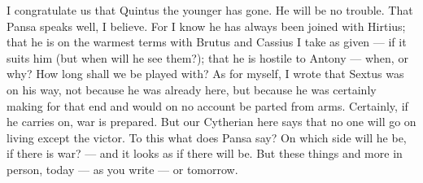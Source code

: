 

 I congratulate us that Quintus the younger has gone. He will be no trouble. That Pansa speaks well, I believe. For I know he has always been joined with Hirtius; that he is on the warmest terms with Brutus and Cassius I take as given --- if it suits him (but when will he see them?); that he is hostile to Antony --- when, or why? How long shall we be played with? As for myself, I wrote that Sextus was on his way, not because he was already here, but because he was certainly making for that end and would on no account be parted from arms. Certainly, if he carries on, war is prepared. But our Cytherian here says that no one will go on living except the victor. To this what does Pansa say? On which side will he be, if there is war? --- and it looks as if there will be. But these things and more in person, today --- as you write --- or tomorrow.
